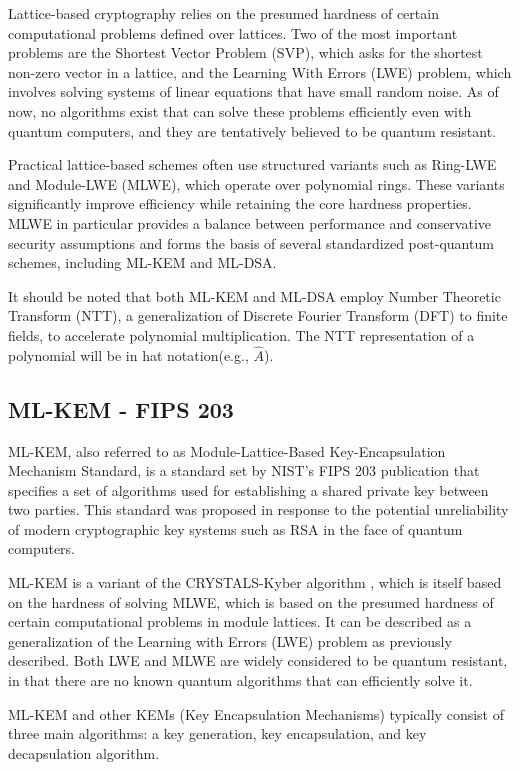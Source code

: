 \documentclass[runningheads]{llncs}
\begin{document}
Lattice-based cryptography relies on the presumed hardness of certain computational problems defined over lattices. Two of the most important problems are the Shortest Vector Problem (SVP), which asks for the shortest non-zero vector in a lattice, and the Learning With Errors (LWE) problem, which involves solving systems of linear equations that have small random noise. As of now, no algorithms exist that can solve these problems efficiently even with quantum computers, and they are tentatively believed to be quantum resistant.

Practical lattice-based schemes often use structured variants such as Ring-LWE and Module-LWE (MLWE), which operate over polynomial rings. These variants significantly improve efficiency while retaining the core hardness properties. MLWE in particular provides a balance between performance and conservative security assumptions and forms the basis of several standardized post-quantum schemes, including ML-KEM and ML-DSA. 

It should be noted that both ML-KEM and ML-DSA employ Number Theoretic Transform (NTT), a generalization of Discrete Fourier Transform (DFT) to finite fields, to accelerate polynomial multiplication. The NTT representation of a polynomial will be in hat notation(e.g., $\hat{A}$).

\subsection{ML-KEM - FIPS 203}
ML-KEM, also referred to as Module-Lattice-Based Key-Encapsulation Mechanism Standard, is a standard set by NIST's FIPS 203 publication that specifies a set of algorithms used for establishing a shared private key between two parties. This standard was proposed in response to the potential unreliability of modern cryptographic key systems such as RSA in the face of quantum computers.

ML-KEM is a variant of the CRYSTALS-Kyber algorithm \cite{2021kyber}, which is itself based on the hardness of solving MLWE, which is based on the presumed hardness of certain computational problems in module lattices. It can be described as a generalization of the Learning with Errors (LWE) problem as previously described. Both LWE and MLWE are widely considered to be quantum resistant, in that there are no known quantum algorithms that can efficiently solve it.

ML-KEM and other KEMs (Key Encapsulation Mechanisms) typically consist of three main algorithms: a key generation, key encapsulation, and key decapsulation algorithm. 
\end{document}
